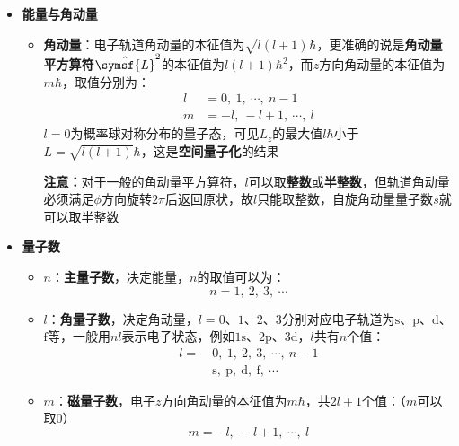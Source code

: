 \documentclass{beamer}
\renewcommand{\mathsf}{\symsf}
\renewcommand\mathsf{\symsf}
\newenvironment{slide}{
    \begin{frame}{\bfseries{\sectiontitle}}
}{
    \end{frame}
}
\begin{document}
\begin{slide}
    \begin{itemize}
        \item \textbf{能量与角动量}

        \begin{itemize}
            \item \textbf{角动量}：电子轨道角动量的本征值为$\sqrt{l(l+1)}\hbar$，更准确的说是\textbf{角动量平方算符}$\hat{\mathsf{L}}^2$的本征值为$l(l+1)\hbar^2$，而$z$方向角动量的本征值为$m\hbar$，取值分别为：
            \begin{align*}
                l &= 0,\ 1,\ \cdots,\ n-1 \\
                m &= -l,\ -l+1,\ \cdots,\ l
            \end{align*}
            $l=0$为概率球对称分布的量子态，可见$L_z$的最大值$l\hbar$小于$L=\sqrt{l(l+1)}\hbar$，这是\textbf{空间量子化}的结果
            \bigskip

            \textbf{注意：}对于一般的角动量平方算符，$l$可以取\textbf{整数}或\textbf{半整数}，但轨道角动量必须满足$\phi$方向旋转$2\pi$后返回原状，故$l$只能取整数，自旋角动量量子数$s$就可以取半整数
        \end{itemize}
    \end{itemize}
\end{slide}


\begin{slide}
    \begin{itemize}
        \item \textbf{量子数}
        \begin{itemize}
            \item $n$：\textbf{主量子数}，决定能量，$n$的取值可以为：
            \[
                n = 1,\ 2,\ 3,\ \cdots
            \]

            \item $l$：\textbf{角量子数}，决定角动量，$l=0$、$1$、$2$、$3$分别对应电子轨道为$\mathrm{s}$、$\mathrm{p}$、$\mathrm{d}$、$\mathrm{f}$等，一般用$nl$表示电子状态，例如$1\mathrm{s}$、$2\mathrm{p}$、$3\mathrm{d}$，$l$共有$n$个值：
            \begin{align*}
                l=\ &0,\ 1,\ 2,\ 3,\ \cdots,\ n-1 \\
                    &\mathrm{s,\ p,\ d,\ f,\ \cdots}
            \end{align*}

            \item $m$：\textbf{磁量子数}，电子$z$方向角动量的本征值为$m\hbar$，共$2l+1$个值：（$m$可以取$0$）
            \[
                m = -l,\ -l+1,\ \cdots,\ l
            \]
        \end{itemize}
    \end{itemize}
\end{slide}
\end{document}
